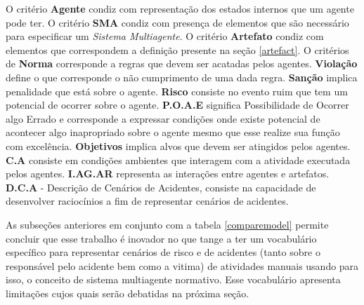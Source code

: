 O critério \textbf{Agente} condiz com representação dos estados internos que um agente pode ter. O critério \textbf{SMA} condiz com presença de elementos que são necessário para especificar um \textit{Sistema Multiagente}. O critério \textbf{Artefato} condiz com elementos que correspondem a definição presente na seção \ref{artefact}. O critérios de \textbf{Norma} corresponde a regras que devem ser acatadas pelos agentes. \textbf{Violação} define o que corresponde o não cumprimento de uma dada regra. \textbf{Sanção} implica penalidade que está sobre o agente. \textbf{Risco} consiste no evento ruim que tem um potencial de ocorrer sobre o agente. \textbf{P.O.A.E} significa Possibilidade de Ocorrer algo Errado e corresponde a expressar condições onde existe potencial de acontecer algo inapropriado sobre o agente mesmo que esse realize sua função com excelência.  \textbf{Objetivos} implica alvos que devem ser atingidos pelos agentes. \textbf{C.A} consiste em condições ambientes que interagem com a atividade executada pelos agentes. \textbf{I.AG.AR} representa as interações entre agentes e artefatos. \textbf{D.C.A} - Descrição de Cenários de Acidentes, consiste na capacidade de desenvolver raciocínios a fim de representar cenários de acidentes.

As subseções anteriores em conjunto com a tabela \ref{comparemodel} permite concluir que esse trabalho é inovador no que tange a ter um vocabulário específico para representar cenários de risco e de acidentes (tanto sobre o responsável pelo acidente bem como a vitima) de atividades manuais usando para isso, o conceito de sistema multiagente normativo. Esse vocabulário apresenta limitações cujos quais serão debatidas na próxima seção. 